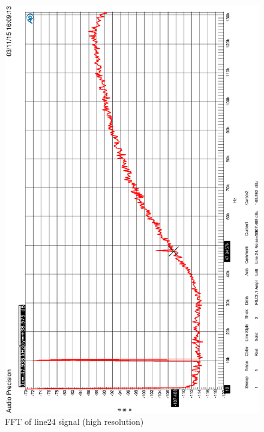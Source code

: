 \documentclass[11pt]{report}
\begin{document}
\begin{appendix}
\begin{figure}[htbp]
\begin{center}
\includegraphics[width=14cm,keepaspectratio=true]{HQFFTrauschen}
\caption{FFT of line24 signal (high resolution)}
\label{Abb.:1}
\end{center}
\end{figure}


\end{appendix}
\end{document}
